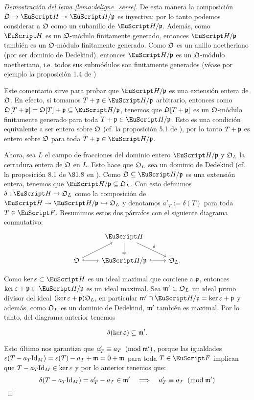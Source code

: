\documentclass[../../tesis_maestria]{subfiles}
\begin{document}
\begin{proof}[Demostraci\'on del lema \ref{lema:deligne_serre}]
  De esta manera la composici\'on $\fO\ra\Hh\epi\Hh/\p$ es inyectiva; por lo tanto podemos considerar a $\mathfrak{O}$ como un subanillo de $\Hh/\p$. Adem\'as, como $\Hh$ es un $\mathfrak{O}$-m\'odulo finitamente generado, entonces $\Hh/\p$ tambi\'en es un $\mathfrak{O}$-m\'odulo finitamente generado. Como $\mathfrak{O}$ es un anillo noetheriano (por ser dominio de Dedekind), entonces $\Hh/\p$ es un $\mathfrak{O}$-m\'odulo noetheriano, i.e. todos sus subm\'odulos son finitamente generados (v\'ease por ejemplo la proposici\'on 1.4 de \cite{EisenbudCA})

  Este comentario sirve para probar que $\Hh/\p$ es una extensi\'on entera de $\mathfrak{O}$. En efecto, si tomamos $T+\p\in\Hh/\p$ arbitrario, entonces como $\fO[T+\p]=\fO[T]+\p\subseteq\Hh/\p$, tenemos que $\mathfrak{O}[T+\mathfrak{p}]$ es un $\mathfrak{O}$-m\'odulo finitamente generado para toda $T+\p\in\Hh/\p$. Esto es una condici\'on equivalente a ser entero sobre $\mathfrak{O}$  (cf. la proposici\'on 5.1 de \cite{AtiyahITCA}), por lo tanto $T+\mathfrak{p}$ es entero sobre $\mathfrak{O}$ para toda $T+\p\in\Hh/\p$.

  Ahora, sea $L$ el campo de fracciones del dominio entero $\Hh/\p$ y $\mathfrak{O}_L$ la cerradura entera de $\mathfrak{O}$ en $L$. Esto hace que $\mathfrak{O}_L$ sea un dominio de Dedekind (cf. la proposici\'on 8.1 de $\S1.8$ en \cite{NeukirchANT}). Como $\fO\subseteq\Hh/\p$ es una extensi\'on entera, tenemos que $\Hh/\p\subseteq\fO_L$. Con esto definimos $\delta:\Hh\ra\fO_L$ como la composici\'on de $\Hh\epi\Hh/\p\hookrightarrow\fO_L$ y denotamos $a'_T:=\delta(T)$ para toda $T\in\Ff$. Resumimos estos dos p\'arrafos con el siguiente diagrama conmutativo:
  \[
    \begin{tikzcd}
      &\Hh \arrow[d,two heads] \arrow[dr,"\delta"]&\\
      \fO \arrow[ur] \arrow[r,hook] & \Hh/\p \arrow[r,hook] & \fO_L.
    \end{tikzcd}
  \]

  Como $\ker\eps\subset\Hh$ es un ideal maximal que contiene a $\mathfrak{p}$, entonces $\ker\eps+\p\subset\Hh/\p$ es un ideal maximal. Sea $\mathfrak{m}'\subset\mathfrak{O}_L$ un ideal primo divisor del ideal $(\ker\varepsilon+\mathfrak{p})\mathfrak{O}_L$, en particular $\m'\cap\Hh/\p=\ker\eps+\p$ y adem\'as, como $\mathfrak{O}_L$ es un dominio de Dedekind, $\mathfrak{m}'$ tambi\'en es maximal. Por lo tanto, del diagrama anterior tenemos
  
  \begin{equation}\label{eq:contraccion_m}
	\delta(\ker\varepsilon)\subseteq\mathfrak{m}'.  
  \end{equation}

  Esto \'ultimo nos garantiza que $a'_T\equiv a_T\;\;(\mathrm{mod}\; \mathfrak{m}')$, porque las igualdades $\varepsilon(T-a_T\mathrm{Id}_M)=\varepsilon(T)-a_T+\mathfrak{m}=0+\mathfrak{m}$ para toda $T\in\Ff$ implican que $T-a_T\mathrm{Id}_M\in\ker\varepsilon$ y por lo anterior tenemos que:
  \begin{equation}\label{eqn:eigenvalorescoincidenmodm}
    \delta(T-a_T\mathrm{Id}_M)=a'_T-a_T\in\mathfrak{m}' \quad\Longrightarrow\quad a'_T\equiv a_T\;\;(\mathrm{mod}\; \mathfrak{m}')
  \end{equation}
 

\end{proof}
\end{document}
